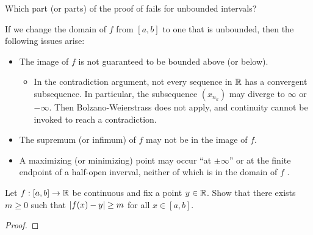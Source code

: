 \begin{problem}
  Which part (or parts) of the proof of  fails for unbounded intervals? 
  \vspace{\baselineskip}

  If we change the domain of $f$ from $[a,b]$ to one that is unbounded, then the following issues arise:
  \begin{itemize}
    \item The image of $f$ is not guaranteed to be bounded above (or below).
      \begin{itemize}
        \item In the contradiction argument, not every sequence in $\mathbb{R}$ has a
          convergent subsequence. In particular, the subsequence $(x_{n_{k}})$ may
          diverge to $\infty$ or $-\infty$. Then Bolzano-Weierstrass does not
          apply, and continuity cannot be invoked to reach a contradiction.
      \end{itemize}
    \item The supremum (or infimum) of $f$ may not be in the image of $f$.
        \item A maximizing (or minimizing) point may occur ``at $\pm \infty$'' or
          at the finite endpoint of a half-open inverval, neither of which is
          in the domain of $f$ . 
  \end{itemize}
\end{problem}

\begin{problem}
  Let $f : [a, b] \to \mathbb{R}$ be continuous and fix a point $y \in \mathbb{R}$. Show that there exists $m \geq 0$ such that
  $\left\lvert f(x) - y \right\rvert \geq m$ for all $x \in [a, b]$.

  \begin{proof}
  \end{proof}
\end{problem}
